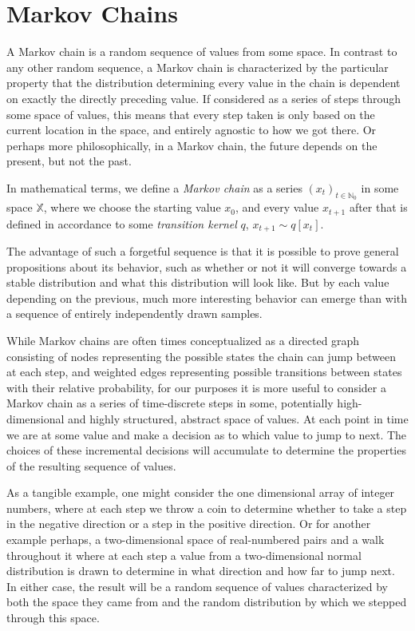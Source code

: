 \section{Markov Chains}

A Markov chain is a random sequence of values from some space. In contrast to any other random sequence, a Markov chain is characterized by the particular property that the distribution determining every value in the chain is dependent on exactly the directly preceding value. If considered as a series of steps through some space of values, this means that every step taken is only based on the current location in the space, and entirely agnostic to how we got there. Or perhaps more philosophically, in a Markov chain, the future depends on the present, but not the past.

In mathematical terms, we define a \textit{Markov chain} as a series $(x_t)_{t \in \mathbb{N}_0}$ in some space $\mathbb{X}$, where we choose the starting value $x_0$, and every value $x_{t + 1}$ after that is defined in accordance to some \textit{transition kernel} $q$, $x_{t+1} \sim q[x_t]$.

The advantage of such a forgetful sequence is that it is possible to prove general propositions about its behavior, such as whether or not it will converge towards a stable distribution and what this distribution will look like. But by each value depending on the previous, much more interesting behavior can emerge than with a sequence of entirely independently drawn samples.

While Markov chains are often times conceptualized as a directed graph consisting of nodes representing the possible states the chain can jump between at each step, and weighted edges representing possible transitions between states with their relative probability, for our purposes it is more useful to consider a Markov chain as a series of time-discrete steps in some, potentially high-dimensional and highly structured, abstract space of values. At each point in time we are at some value and make a decision as to which value to jump to next. The choices of these incremental decisions will accumulate to determine the properties of the resulting sequence of values.

As a tangible example, one might consider the one dimensional array of integer numbers, where at each step we throw a coin to determine whether to take a step in the negative direction or a step in the positive direction. Or for another example perhaps, a two-dimensional space of real-numbered pairs and a walk throughout it where at each step a value from a two-dimensional normal distribution is drawn to determine in what direction and how far to jump next. In either case, the result will be a random sequence of values characterized by both the space they came from and the random distribution by which we stepped through this space.

